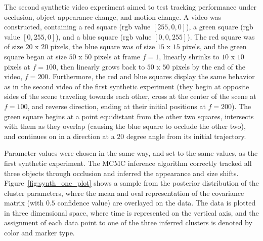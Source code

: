 \documentclass[twocolumn, final]{svjour3}
\newcommand{\willie}[1]{\textcolor{green}{\textsf{\emph{\textbf{\textcolor{green}{#1}}}}}}
\begin{document}

The second synthetic video experiment aimed to test tracking performance under occlusion, object appearance change, and motion change. A video was constructed, containing a red square (rgb value $[255,0,0]$), a green square (rgb value $[0,255,0]$), and a blue square (rgb value $[0,0,255]$). The red square was of size $20$ x $20$ pixels, the blue square was of size $15$ x $15$ pixels, and the green square began at size $50$ x $50$ pixels at frame $f=1$, linearly shrinks to $10$ x $10$ pixels at $f=100$, then linearly grows back to $50$ x $50$ pixels by the end of the video, $f=200$. Furthermore, the red and blue squares display the same behavior as in the second video of the first synthetic experiment (they begin at opposite sides of the scene traveling towards each other, cross at the center of the scene at $f=100$, and reverse direction, ending at their initial positions at $f=200$). The green square begins at a point equidistant from the other two squares, intersects with them as they overlap (causing the blue square to occlude the other two), and continues on in a direction at a 20 degree angle from its initial trajectory.

Parameter values were chosen in the same way, and set to the same values, as the first synthetic experiment. The MCMC inference algorithm correctly tracked all three objects through occlusion and inferred the appearance and size shifts. Figure~\ref{fig:synth_one_plot} shows a sample from the posterior distribution of the cluster parameters, where the mean and oval representation of the covariance matrix (with $0.5$ confidence value) are overlayed on the data. The data is plotted in three dimensional space, where time is represented on the vertical axis, and the assignment of each data point to one of the three inferred clusters is denoted by color and marker type. 


\end{document}
